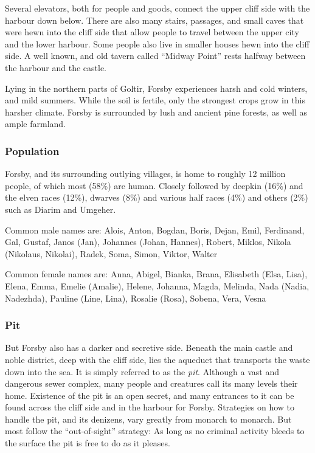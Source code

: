 Several elevators, both for people and goods, connect the upper cliff side
with the harbour down below. There are also many stairs, passages, and small
caves that were hewn into the cliff side that allow people to travel between
the upper city and the lower harbour. Some people also live in smaller houses
hewn into the cliff side. A well known, and old tavern called ``Midway Point''
rests halfway between the harbour and the castle.

Lying in the northern parts of Goltir, Forsby experiences harsh and cold
winters, and mild summers. While the soil is fertile, only the strongest crops
grow in this harsher climate. Forsby is surrounded by lush and ancient pine
forests, as well as ample farmland.

\subsubsection{Population}

Forsby, and its surrounding outlying villages, is home to roughly 12 million
people, of which most (58\%) are human. Closely followed by deepkin (16\%)
and the elven races (12\%), dwarves (8\%) and various half races (4\%) and
others (2\%) such as Diarim and Umgeher.

Common male names are: Alois, Anton, Bogdan, Boris, Dejan, Emil, Ferdinand,
Gal, Gustaf, Janos (Jan), Johannes (Johan, Hannes), Robert, Miklos, Nikola
(Nikolaus, Nikolai), Radek, Soma, Simon, Viktor, Walter

Common female names are: Anna, Abigel, Bianka, Brana, Elisabeth (Elsa, Lisa),
Elena, Emma, Emelie (Amalie), Helene, Johanna, Magda, Melinda, Nada (Nadia,
Nadezhda), Pauline (Line, Lina), Rosalie (Rosa), Sobena, Vera, Vesna

\subsubsection{Pit}
\label{sec:Pit}

But Forsby also has a darker and secretive side. Beneath the main castle and
noble district, deep with the cliff side, lies the aqueduct that transports
the waste down into the sea. It is simply referred to as the \emph{pit}.
Although a vast and dangerous sewer complex, many people and creatures call
its many levels their home. Existence of the pit is an open secret, and many
entrances to it can be found across the cliff side and in the harbour for
Forsby. Strategies on how to handle the pit, and its denizens, vary greatly
from monarch to monarch. But most follow the ``out-of-sight'' strategy: As
long as no criminal activity bleeds to the surface the pit is free to do as
it pleases.

